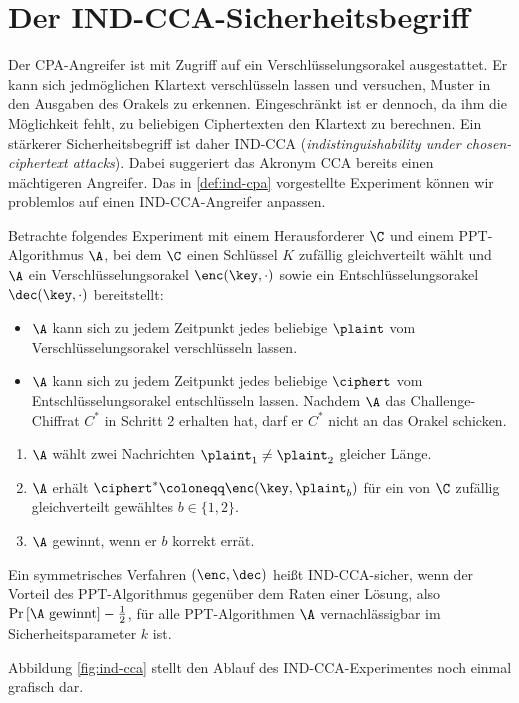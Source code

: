 \section{Der IND-CCA-Sicherheitsbegriff}
Der CPA-Angreifer ist mit Zugriff auf ein Verschlüsselungsorakel ausgestattet. Er kann sich jedmöglichen Klartext verschlüsseln lassen und
versuchen, Muster in den Ausgaben des Orakels zu erkennen. Eingeschränkt ist er dennoch, da ihm die Möglichkeit fehlt, zu beliebigen
Ciphertexten den Klartext zu berechnen. Ein stärkerer Sicherheitsbegriff ist daher IND-CCA (\emph{indistinguishability under chosen-ciphertext attacks}). Dabei suggeriert das Akronym CCA bereits einen mächtigeren Angreifer. Das in \ref{def:ind-cpa} vorgestellte Experiment können wir problemlos auf einen IND-CCA-Angreifer anpassen.

\begin{definition}
	Betrachte folgendes Experiment mit einem Herausforderer $\C$ und einem PPT-Algorithmus $\A$, bei dem $\C$ einen Schlüssel $K$ zufällig gleichverteilt wählt und $\A$ ein Verschlüsselungsorakel $\enc(\key,\cdot)$ sowie ein Entschlüsselungsorakel $\dec(\key,\cdot)$ bereitstellt:
	\begin{itemize}
		\item $\A$ kann sich zu jedem Zeitpunkt jedes beliebige $\plaint$ vom Verschlüsselungsorakel verschlüsseln lassen.
		\item $\A$ kann sich zu jedem Zeitpunkt jedes beliebige
                  $\ciphert$ vom Entschlüsselungsorakel entschlüsseln
                  lassen. Nachdem $\A$ das Challenge-Chiffrat $C^*$ in Schritt 2 erhalten hat,
                  darf er $C^*$ nicht an das Orakel schicken.
	\end{itemize}
	\begin{enumerate}
		\item $\A$ wählt zwei Nachrichten $\plaint_1 \neq \plaint_2$ gleicher Länge.
		\item $\A$ erhält $\ciphert^{\ast} \coloneqq \enc(\key, \plaint_{b})$ für ein von $\C$ zufällig gleichverteilt gewähltes $b \in \{1, 2\}$.
		\item $\A$ gewinnt, wenn er $b$ korrekt errät.
	\end{enumerate}
	Ein symmetrisches Verfahren $(\enc, \dec)$ heißt IND-CCA-sicher, wenn der Vorteil des
        PPT-Algorithmus gegenüber dem Raten einer Lösung, also $\Pr
        \left[\A \textnormal{ gewinnt} \right] - \frac{1}{2}$, für alle
        PPT-Algorithmen $\A$ vernachlässigbar im Sicherheitsparameter $k$ ist. 
\end{definition}
Abbildung \ref{fig:ind-cca} stellt den Ablauf des IND-CCA-Experimentes
noch einmal grafisch dar.

